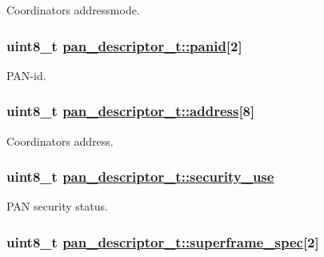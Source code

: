 Coordinators addressmode. \hypertarget{structpan__descriptor__t_e94a30aedfc41b7ca0e551bd8928a3ab}{
\subsubsection[panid]{\setlength{\rightskip}{0pt plus 5cm}uint8\_\-t \hyperlink{structpan__descriptor__t_e94a30aedfc41b7ca0e551bd8928a3ab}{pan\_\-descriptor\_\-t::panid}\mbox{[}2\mbox{]}}}
\label{structpan__descriptor__t_e94a30aedfc41b7ca0e551bd8928a3ab}


PAN-id. \hypertarget{structpan__descriptor__t_06b11f6bb4786384c45457c81e9335e5}{
\subsubsection[address]{\setlength{\rightskip}{0pt plus 5cm}uint8\_\-t \hyperlink{structpan__descriptor__t_06b11f6bb4786384c45457c81e9335e5}{pan\_\-descriptor\_\-t::address}\mbox{[}8\mbox{]}}}
\label{structpan__descriptor__t_06b11f6bb4786384c45457c81e9335e5}


Coordinators address. \hypertarget{structpan__descriptor__t_d1f137dbd55028eaedf8ff0b444dfe25}{
\subsubsection[security\_\-use]{\setlength{\rightskip}{0pt plus 5cm}uint8\_\-t \hyperlink{structpan__descriptor__t_d1f137dbd55028eaedf8ff0b444dfe25}{pan\_\-descriptor\_\-t::security\_\-use}}}
\label{structpan__descriptor__t_d1f137dbd55028eaedf8ff0b444dfe25}


PAN security status. \hypertarget{structpan__descriptor__t_53f9ddb90f42af95b7a62d48c9a891a0}{
\subsubsection[superframe\_\-spec]{\setlength{\rightskip}{0pt plus 5cm}uint8\_\-t \hyperlink{structpan__descriptor__t_53f9ddb90f42af95b7a62d48c9a891a0}{pan\_\-descriptor\_\-t::superframe\_\-spec}\mbox{[}2\mbox{]}}}
\label{structpan__descriptor__t_53f9ddb90f42af95b7a62d48c9a891a0}


